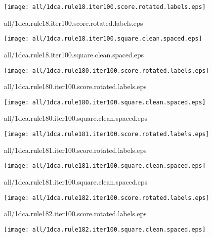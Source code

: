 \documentclass{article}
\begin{document}
\begin{center}
\begin{minipage}{\textwidth}
\texttt{[image: all/1dca.rule18.iter100.score.rotated.labels.eps]}
\end{minipage}
\end{center}
{\footnotesize all/1dca.rule18.iter100.score.rotated.labels.eps}
\begin{center}
\begin{minipage}{\textwidth}
\texttt{[image: all/1dca.rule18.iter100.square.clean.spaced.eps]}
\end{minipage}
\end{center}
{\footnotesize all/1dca.rule18.iter100.square.clean.spaced.eps}
\begin{center}
\begin{minipage}{\textwidth}
\texttt{[image: all/1dca.rule180.iter100.score.rotated.labels.eps]}
\end{minipage}
\end{center}
{\footnotesize all/1dca.rule180.iter100.score.rotated.labels.eps}
\begin{center}
\begin{minipage}{\textwidth}
\texttt{[image: all/1dca.rule180.iter100.square.clean.spaced.eps]}
\end{minipage}
\end{center}
{\footnotesize all/1dca.rule180.iter100.square.clean.spaced.eps}
\begin{center}
\begin{minipage}{\textwidth}
\texttt{[image: all/1dca.rule181.iter100.score.rotated.labels.eps]}
\end{minipage}
\end{center}
{\footnotesize all/1dca.rule181.iter100.score.rotated.labels.eps}
\begin{center}
\begin{minipage}{\textwidth}
\texttt{[image: all/1dca.rule181.iter100.square.clean.spaced.eps]}
\end{minipage}
\end{center}
{\footnotesize all/1dca.rule181.iter100.square.clean.spaced.eps}
\begin{center}
\begin{minipage}{\textwidth}
\texttt{[image: all/1dca.rule182.iter100.score.rotated.labels.eps]}
\end{minipage}
\end{center}
{\footnotesize all/1dca.rule182.iter100.score.rotated.labels.eps}
\begin{center}
\begin{minipage}{\textwidth}
\texttt{[image: all/1dca.rule182.iter100.square.clean.spaced.eps]}
\end{minipage}
\end{center}
\end{document}
